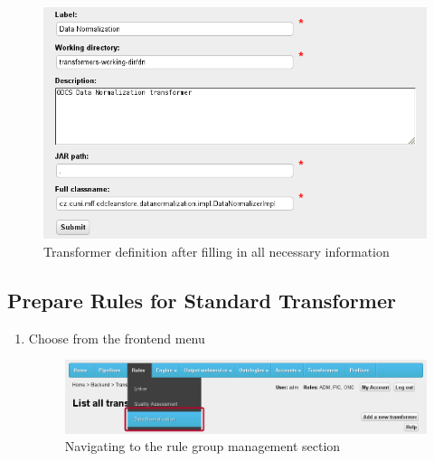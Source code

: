 {\begin{enumerate}
\begin{figure}[!ht]
    \centering
    \includegraphics[width=\textwidth]{images/fe-walkthrough-new-transformer.png}
    \caption{Transformer definition after filling in all necessary information}
	\label{fig:feWTNewTransformers}
\end{figure}

\FloatBarrier

\end{enumerate}

\newpage
\subsection*{Prepare Rules for Standard Transformer}
\begin{enumerate}[resume]

\vspace*{0.2\textheight}

	\item Choose  from the frontend menu

\begin{figure}[!ht]
    \centering
    \includegraphics[width=\textwidth]{images/fe-walkthrough-menu-rules.png}
    \caption{Navigating to the rule group management section}
	\label{fig:feWTMenuRules}
\end{figure}
\FloatBarrier

\vspace*{0.2\textheight}


\end{enumerate}}
